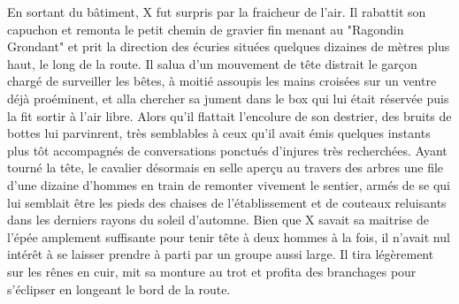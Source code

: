 \documentclass{book}
\begin{document}
En sortant du bâtiment, X fut surpris par la fraicheur de l'air. Il rabattit son capuchon et remonta le petit chemin de gravier fin menant au "Ragondin Grondant" et prit la direction des écuries situées quelques dizaines de mètres plus haut, le long de la route. Il salua d'un mouvement de tête distrait le garçon chargé de surveiller les bêtes, à moitié assoupis les mains croisées sur un ventre déjà proéminent, et alla chercher sa jument dans le box qui lui était réservée puis la fit sortir à l'air libre. Alors qu'il flattait l'encolure de son destrier, des bruits de bottes lui parvinrent, très semblables à ceux qu'il avait émis quelques instants plus tôt accompagnés de conversations ponctués d'injures très recherchées. Ayant tourné la tête, le cavalier désormais en selle aperçu au travers des arbres une file d'une dizaine d'hommes en train de remonter vivement le sentier, armés de se qui lui semblait être les pieds des chaises de l'établissement et de couteaux reluisants dans les derniers rayons du soleil d'automne. Bien que X savait sa maitrise de l'épée amplement suffisante pour tenir tête à deux hommes à la fois, il n'avait nul intérêt à se laisser prendre à parti par un groupe aussi large.
Il tira légèrement sur les rênes en cuir, mit sa monture au trot et profita des branchages pour s'éclipser en longeant le bord de la route. \newline
\end{document}
